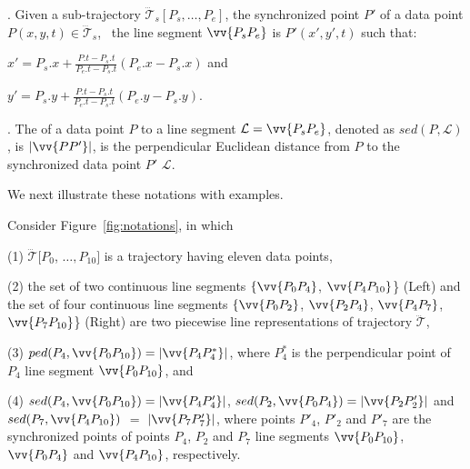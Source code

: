 . Given a sub-trajectory $\dddot{\mathcal{T}}_s[P_s, \ldots, P_e]$, the synchronized point $P'$ of a data point  $P(x, y, t) \in \dddot{\mathcal{T}}_s$, ~\wrt the line segment $\vv{P_sP_e}$ is $P'(x', y', t)$ such that:

\ni $x' = P_s.x +  \frac{P.t-P_s.t}{P_e.t-P_s.t}(P_e.x - P_s.x)$ and

\ni $y' = P_s.y +  \frac{P.t-P_s.t}{P_e.t-P_s.t}(P_e.y - P_s.y)$.


. The \sed of a data point $P$ to a line segment $\mathcal{L} = \vv{P_{s}P_{e}}$, denoted as $sed(P, \mathcal{L})$, is $|\vv{PP'}|$, is the perpendicular Euclidean distance from $P$ to the synchronized data point $P'$ \wrt $\mathcal{L}$. %




We next illustrate these notations with examples.

\begin{example}
\label{exm-notations}
Consider Figure~\ref{fig:notations}, in which

\sstab(1) $\dddot{\mathcal{T}}[P_0$, $\ldots, P_{10}]$ is a trajectory having eleven data points,

\sstab (2) the set of two continuous line segments $\{\vv{P_0P_4}$, $\vv{P_4P_{10}}$\} (Left) and the set of four continuous line segments $\{\vv{P_0P_2}$, $\vv{P_2P_4}$, $\vv{P_4P_7}$, $\vv{P_7P_{10}}$\} (Right) are two piecewise line representations of trajectory $\dddot{\mathcal{T}}$,

\sstab(3) $ped(P_4, \vv{P_0P_{10}})=|\vv{P_4P^*_4}|$, where $P^*_4$ is the perpendicular point of $P_4$ \wrt line segment $\vv{P_0P_{10}}$, and

\sstab (4) $sed(P_4, \vv{P_0P_{10}})= |\vv{P_4P'_4}|$, $sed(P_2, \vv{P_0P_{4}})= |\vv{P_2P'_2}|$ and $sed(P_7, \vv{P_4P_{10}})$ $=$ $|\vv{P_7P'_7}|$,
where points $P'_4$, $P'_2$ and $P'_7$ are the synchronized points of points $P_4$, $P_2$ and $P_7$ \wrt line segments $\vv{P_0P_{10}}$, $\vv{P_0P_{4}}$ and $\vv{P_4P_{10}}$, respectively.
\end{example}

